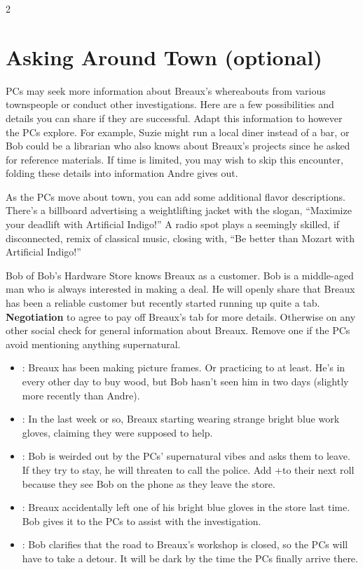 \documentclass{book}
\newcommand{\df}{\DifficultyDie }
\newcommand{\stb}{\SetbackDie }
\newcommand{\ch}{\ChallengeDie }
\newcommand{\ai}{{\color{cyan}Artificial Indigo}\xspace}
\begin{document}
\begin{multicols*}{2}
\section{Asking Around Town (optional)}

PCs may seek more information about Breaux's whereabouts from various townspeople or conduct other investigations.  Here are a few possibilities and details you can share if they are successful.  Adapt this information to however the PCs explore.  For example, Suzie might run a local diner instead of a bar, or Bob could be a librarian who also knows about Breaux's projects since he asked for reference materials.  If time is limited, you may wish to skip this encounter, folding these details into information Andre gives out.

As the PCs move about town, you can add some additional flavor descriptions.  There's a billboard advertising a weightlifting jacket with the slogan, ``Maximize your deadlift with \ai!''  A radio spot plays a seemingly skilled, if disconnected, remix of classical music, closing with, ``Be better than Mozart with \ai!''

Bob of Bob's Hardware Store knows Breaux as a customer.  Bob is a middle-aged man who is always interested in making a deal.  He will openly share that Breaux has been a reliable customer but recently started running up quite a tab.  \ch\df\stb \textbf{Negotiation} to agree to pay off Breaux's tab for more details.  Otherwise \df\df\stb\stb on any other social check for general information about Breaux.  Remove one \stb if the PCs avoid mentioning anything supernatural.

\vspace{-1em}
\begin{itemize}
\setlength\itemsep{-.5em}
    \item \Success: Breaux has been making picture frames.  Or practicing to at least.  He's in every other day to buy wood, but Bob hasn't seen him in two days (slightly more recently than Andre).
    \item \Advantage\Advantage:  In the last week or so, Breaux starting wearing strange bright blue work gloves, claiming they were supposed to help.
    \item \Threat\Threat: Bob is weirded out by the PCs' supernatural vibes and asks them to leave.  If they try to stay, he will threaten to call the police.  Add +\stb to their next roll because they see Bob on the phone as they leave the store.
    \item \Triumph: Breaux accidentally left one of his bright blue gloves in the store last time.  Bob gives it to the PCs to assist with the investigation.
    \item \Despair: Bob clarifies that the road to Breaux's workshop is closed, so the PCs will have to take a detour.  It will be dark by the time the PCs finally arrive there.
\end{itemize}


\end{multicols*}
\end{document}
